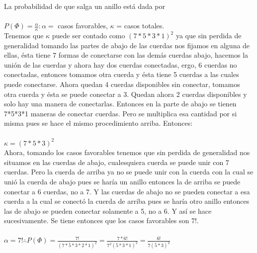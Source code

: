 \documentclass[12pt,a4paper]{report}
\begin{document}
\begin{enumerate}
{    La probabilidad de que salga un anillo está dada por \\ \\
    $P(\Phi)= \frac{\alpha}{\kappa} : \alpha = $ casos favorables, $\kappa$ = casos totales. \\

    Tenemos que $\kappa$ puede ser contado como $(7*5*3*1)^2$ ya que sin perdida de generalidad tomando las partes de abajo de las cuerdas nos fijamos en alguna de ellas, ésta tiene 7 formas de conectarse con las demás cuerdas abajo, hacemos la unión de las cuerdas y ahora  hay dos cuerdas conectadas, ergo, 6 cuerdas no conectadas, entonces tomamos otra cuerda y ésta tiene 5 cuerdas a las cuales puede conectarse. Ahora quedan 4 cuerdas disponibles sin conectar, tomamos otra cuerda y ésta se puede conectar a 3. Quedan ahora 2 cuerdas disponibles y solo hay una manera de conectarlas. Entonces en la parte de abajo se tienen 7*5*3*1 maneras de conectar cuerdas. Pero se multiplica esa cantidad por si misma pues se hace el mismo procedimiento arriba. Entonces: \\ \\
    $\kappa= (7*5*3)^2$\\

    Ahora, tomando los casos favorables tenemos que sin perdida de generalidad nos situamos en las cuerdas de abajo, cualesquiera cuerda se puede unir con 7 cuerdas. Pero la cuerda de arriba ya no se puede unir con la cuerda con la cual se unió la cuerda de abajo pues se haría un anillo entonces la de arriba se puede conectar a 6 cuerdas, no a 7. Y las cuerdas de abajo no se pueden conectar a esa cuerda a la cual se conectó la cuerda de arriba pues se haría otro anillo entonces las de abajo se pueden conectar solamente a 5, no a 6. Y así se hace sucesivamente. Se tiene entonces que los casos favorables son 7!. \\ \\
    $\alpha = 7! \therefore P(\Phi)=\frac{7!}{(7*5*3*2*1)^2}=\frac{7*6!}{7^2(5*3*1)^2}=\frac{6!}{7(5*3)^2}$
	}



\end{enumerate}
\end{document}
